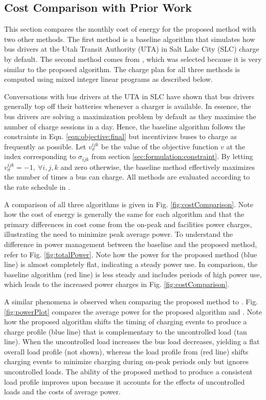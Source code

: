 \subsection{Cost Comparison with Prior Work\label{sec:results:prior}} 
This section compares the monthly cost of energy for the proposed method with two other methods. The first method is a baseline algorithm that simulates how bus drivers at the Utah Transit Authority (UTA) in Salt Lake City (SLC) charge by default. The second method comes from \cite{He_2019_Fast}, which was selected because it is very similar to the proposed algorithm. The charge plan for all three methods is computed using mixed integer linear programs as described below.  
\par Conversations with bus drivers at the UTA in SLC have shown that bus drivers generally top off their batteries whenever a charger is available. In essence, the bus drivers are solving a maximization problem by default as they maximise the number of charge sessions in a day. Hence, the baseline algorithm follows the constraints in Eqn. \eqref{eqn:objective:final} but incentivizes buses to charge as frequently as possible. Let $v_{\sigma}^{ijk}$ be the value of the objective function $v$ at the index corresponding to $\sigma_{ijk}$ from section \ref{sec:formulation:constraint}. By letting $v^{ijk}_{\sigma} = -1, \ \forall i,j,k$ and zero otherwise, the baseline method effectively maximizes the number of times a bus can charge.  
 All methods are evaluated according to the rate schedule in \cite{rocky_mountain_power_rocky_2021}. 
 \par A comparison of all three algorithms is given in Fig. \ref{fig:costComparison}. Note how the cost of energy is generally the same for each algorithm and that the primary differences in cost come from the on-peak and facilities power charges, illustrating the need to minimize peak average power. To understand the difference in power management between the baseline and the proposed method, refer to Fig. \ref{fig:totalPower}. Note how the power for the proposed method (blue line) is almost completely flat, indicating a steady power use. In comparison, the baseline algorithm (red line) is less steady and includes periods of high power use, which leads to the increased power charges in Fig. \ref{fig:costComparison}.
 \par A similar phenomena is observed when comparing the proposed method to \cite{He_2019_Fast}. Fig. \ref{fig:powerPlot} compares the average power for the proposed algorithm and \cite{He_2019_Fast}.  Note how the proposed algorithm shifts the timing of charging events to produce a charge profile (blue line) that is complementary to the uncontrolled load (tan line).  When the uncontrolled load increases the bus load decreases, yielding a flat overall load profile (not shown), whereas the load profile from \cite{He_2019_Fast} (red line) shifts charging events to minimize charging during on-peak periods only but ignores uncontrolled loads. The ability of the proposed method to produce a consistent load profile improves upon \cite{He_2019_Fast} because it accounts for the effects of uncontrolled loads and the costs of average power. 

